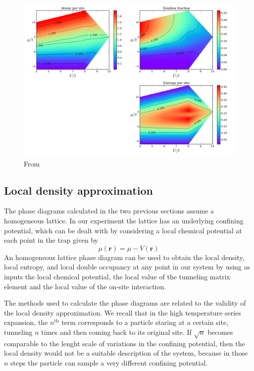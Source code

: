 \documentclass[oneside,11pt]{memoir}
\newcommand{\bv}[1]{\ensuremath{\bm{#1}}}
\begin{document}
\begin{figure}
\centering \includegraphics[width=\textwidth]{../figures/HubbardPhaseDiagram_figures/FUCHS_phasesT=3.png}
\caption[Low temperature phase diagram of the Fermi-Hubbard model]{\small
From~\cite{Fuchs2011}} \label{fig:fuchs10}
\end{figure}


\subsection{ Local density approximation }



The phase diagrams calculated in the two previous sections assume a homogeneous
lattice.  In our experiment the lattice has an underlying confining potential,
which can be dealt with by considering a local chemical potential at each point
in the trap given by
\begin{equation}
 \mu(\bv{r}) = \mu - V(\bv{r}) 
\end{equation}
An homogeneous lattice phase diagram can be used to obtain the local density,
local entropy, and local double occupancy at any point in our system by using
as inputs the local chemical potential,  the local value of the tunneling
matrix element and the local value of the on-site interaction.  

The methods used to calculate the phase diagrams are related to the validity of
the local density approximation.   We recall that in the high temperature
series expansion, the $n^{\text{th}}$  term corresponds to a particle staring
at a certain site, tunneling $n$ times and then coming back to its original
site.  If $\sqrt{n}$ becomes comparable to the lenght scale of variations in
the confining potential, then the local density would not be a suitable
description of the system, because in those $n$ steps the particle can sample a
very different confining potential.  
\end{document}
